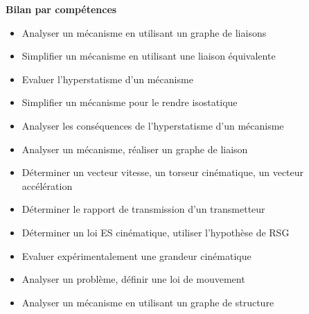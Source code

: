 \noindent \textbf{Bilan par compétences}
 
\begin{itemize} 
\item  \footnotesize {} \normalsize \hspace{.2cm}Analyser un mécanisme en utilisant un graphe de liaisons\hfill {}
\item  \footnotesize {} \normalsize \hspace{.2cm}Simplifier un mécanisme en utilisant une liaison équivalente\hfill {}
\item  \footnotesize {} \normalsize \hspace{.2cm}Evaluer l'hyperstatisme d'un mécanisme\hfill {}
\item  \footnotesize {} \normalsize \hspace{.2cm}Simplifier un mécanisme pour le rendre isostatique\hfill {}
\item  \footnotesize {} \normalsize \hspace{.2cm}Analyser les conséquences de l'hyperstatisme d'un mécanisme\hfill {}
\item  \footnotesize {} \normalsize \hspace{.2cm}Analyser un mécanisme, réaliser un graphe de liaison\hfill {}
\item  \footnotesize {} \normalsize \hspace{.2cm}Déterminer un vecteur vitesse, un torseur cinématique, un vecteur accélération\hfill {}
\item  \footnotesize {} \normalsize \hspace{.2cm}Déterminer le rapport de transmission d'un transmetteur\hfill {}
\item  \footnotesize {} \normalsize \hspace{.2cm}Déterminer un loi ES cinématique, utiliser l'hypothèse de RSG\hfill {}
\item  \footnotesize {} \normalsize \hspace{.2cm}Evaluer expérimentalement une grandeur cinématique\hfill {}
\item  \footnotesize {} \normalsize \hspace{.2cm}Analyser un problème, définir une loi de mouvement \hfill {}
\item  \footnotesize {} \normalsize \hspace{.2cm}Analyser un mécanisme en utilisant un graphe de structure\hfill {}

\end{itemize}
